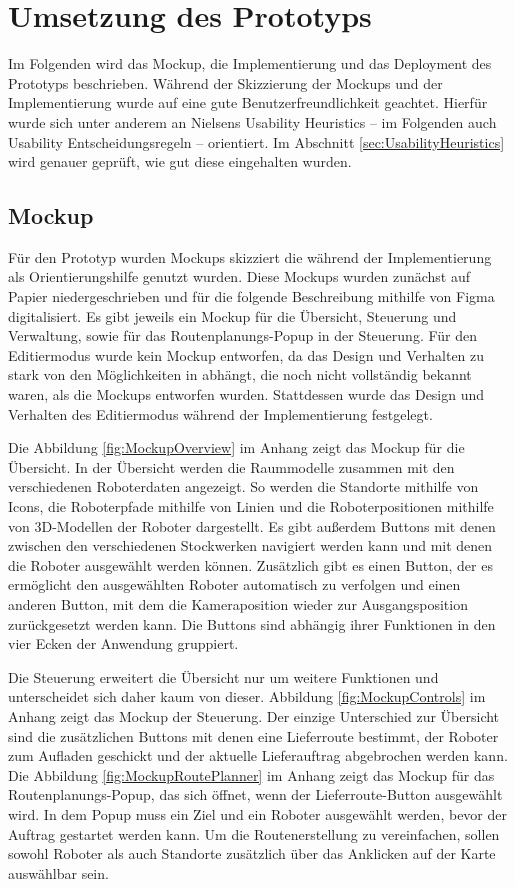 \newpage
\section{Umsetzung des Prototyps}\label{sec:RealizationOfPrototype}
Im Folgenden wird das \gls{Mockup}, die Implementierung und das Deployment des Prototyps beschrieben. Während der Skizzierung der \gls{Mockup}s und der Implementierung wurde auf eine gute Benutzerfreundlichkeit geachtet. Hierfür wurde sich unter anderem an Nielsens Usability Heuristics \cite{Nielsen.1994} – im Folgenden auch Usability Entscheidungsregeln – orientiert. Im Abschnitt \ref{sec:UsabilityHeuristics} wird genauer geprüft, wie gut diese eingehalten wurden.

\subsection{Mockup}\label{sec:Mockup}
Für den Prototyp wurden \gls{Mockup}s skizziert die während der Implementierung als Orientierungshilfe genutzt wurden. Diese \gls{Mockup}s wurden zunächst auf Papier niedergeschrieben und für die folgende Beschreibung mithilfe von Figma \cite{Figma} digitalisiert. Es gibt jeweils ein \gls{Mockup} für die Übersicht, Steuerung und Verwaltung, sowie für das Routenplanungs-Popup in der Steuerung. Für den Editiermodus wurde kein \gls{Mockup} entworfen, da das Design und Verhalten zu stark von den Möglichkeiten in \deckgl{} abhängt, die noch nicht vollständig bekannt waren, als die \gls{Mockup}s entworfen wurden. Stattdessen wurde das Design und Verhalten des Editiermodus während der Implementierung festgelegt.

Die Abbildung \ref{fig:MockupOverview} im Anhang zeigt das \gls{Mockup} für die Übersicht. In der Übersicht werden die Raummodelle zusammen mit den verschiedenen Roboterdaten angezeigt. So werden die Standorte mithilfe von Icons, die Roboterpfade mithilfe von Linien und die Roboterpositionen mithilfe von 3D-Modellen der Roboter dargestellt. Es gibt außerdem Buttons mit denen zwischen den verschiedenen Stockwerken navigiert werden kann und mit denen die Roboter ausgewählt werden können. Zusätzlich gibt es einen Button, der es ermöglicht den ausgewählten Roboter automatisch zu verfolgen und einen anderen Button, mit dem die Kameraposition wieder zur Ausgangsposition zurückgesetzt werden kann. Die Buttons sind abhängig ihrer Funktionen in den vier Ecken der Anwendung gruppiert.

Die Steuerung erweitert die Übersicht nur um weitere Funktionen und unterscheidet sich daher kaum von dieser. Abbildung \ref{fig:MockupControls} im Anhang zeigt das \gls{Mockup} der Steuerung. Der einzige Unterschied zur Übersicht sind die zusätzlichen Buttons mit denen eine Lieferroute bestimmt, der Roboter zum Aufladen geschickt und der aktuelle Lieferauftrag abgebrochen werden kann. Die Abbildung \ref{fig:MockupRoutePlanner} im Anhang zeigt das \gls{Mockup} für das Routenplanungs-Popup, das sich öffnet, wenn der Lieferroute-Button ausgewählt wird. In dem Popup muss ein Ziel und ein Roboter ausgewählt werden, bevor der Auftrag gestartet werden kann. Um die Routenerstellung zu vereinfachen, sollen sowohl Roboter als auch Standorte zusätzlich über das Anklicken auf der Karte auswählbar sein.

